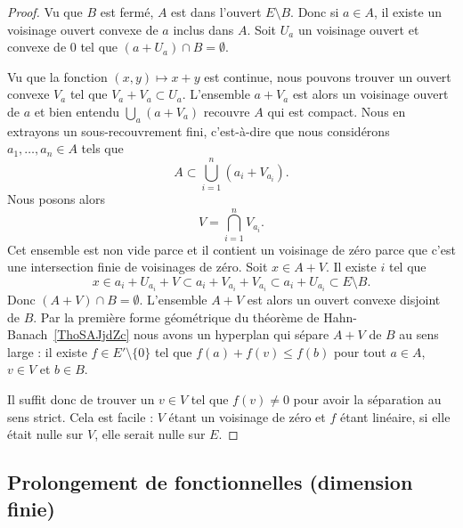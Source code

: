 	\begin{proof}
		Vu que \( B\) est fermé, \( A\) est dans l'ouvert \( E\setminus B\). Donc si \( a\in A\), il existe un voisinage ouvert convexe de \( a\) inclus dans \( A\). Soit \( U_a\) un voisinage ouvert et convexe de \( 0\) tel que \( (a+U_a)\cap B=\emptyset\).

		Vu que la fonction \( (x,y)\mapsto x+y\) est continue, nous pouvons trouver un ouvert convexe \( V_a\) tel que \( V_a+V_a\subset U_a\). L'ensemble \( a+V_a\) est alors un voisinage ouvert de \( a\) et bien entendu \( \bigcup_a(a+V_a)\) recouvre \( A\) qui est compact. Nous en extrayons un sous-recouvrement fini, c'est-à-dire que nous considérons \( a_1,\ldots, a_n\in A\) tels que
		\begin{equation}
			A\subset \bigcup_{i=1}^n(a_i+V_{a_i}).
		\end{equation}
		Nous posons alors
		\begin{equation}
			V=\bigcap_{i=1}^nV_{a_i}.
		\end{equation}
		Cet ensemble est non vide parce et il contient un voisinage de zéro parce que c'est une intersection finie de voisinages de zéro. Soit \( x\in A+V\). Il existe \( i\) tel que
		\begin{equation}
			x\in a_i+U_{a_i}+V\subset a_i+V_{a_i}+V_{a_i}\subset a_i+U_{a_i}\subset E\setminus B.
		\end{equation}
		Donc \( (A+V)\cap B=\emptyset\). L'ensemble \( A+V\) est alors un ouvert convexe disjoint de \( B\). Par la première forme géométrique du théorème de Hahn-Banach~\ref{ThoSAJjdZc} nous avons un hyperplan qui sépare \( A+V\) de \( B\) au sens large : il existe \( f\in E'\setminus\{ 0 \}\) tel que \( f(a)+f(v)\leq f(b)\) pour tout \( a\in A\), \( v\in V\) et \( b\in B\).

		Il suffit donc de trouver un \( v\in V\) tel que \( f(v)\neq 0\) pour avoir la séparation au sens strict. Cela est facile : \( V\) étant un voisinage de zéro et \( f\) étant linéaire, si elle était nulle sur \( V\), elle serait nulle sur \( E\).
	\end{proof}

	\subsection{Prolongement de fonctionnelles (dimension finie)}

